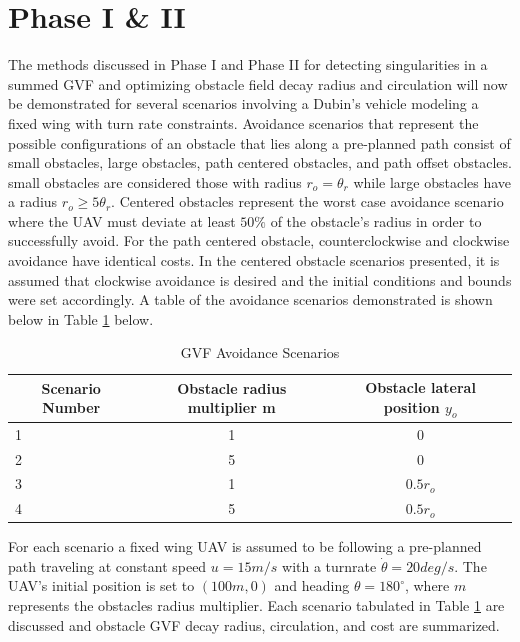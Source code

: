 \documentclass[numbered,pdftex]{ohio-etd}
\begin{document}
\section{Phase I \& II}

The methods discussed in Phase I and Phase II for detecting singularities in a summed GVF and optimizing obstacle field decay radius and circulation will now be demonstrated for several scenarios involving a Dubin's vehicle modeling a fixed wing with turn rate constraints. Avoidance scenarios that represent the possible configurations of an obstacle that lies along a pre-planned path consist of small obstacles, large obstacles, path centered obstacles, and path offset obstacles. small obstacles are considered those with radius $r_o = \theta_r$ while large obstacles have a radius $r_o\ge5\theta_r$. Centered obstacles represent the worst case avoidance scenario where the UAV must deviate at least $50\%$ of the obstacle's radius in order to successfully avoid. For the path centered obstacle, counterclockwise and clockwise avoidance have identical costs. In the centered obstacle scenarios presented, it is assumed that clockwise avoidance is desired and the initial conditions and bounds were set accordingly. A table of the avoidance scenarios demonstrated is shown below in Table \ref{table:avoidanceScenarios} below.


\begin{table}[]
	\centering
	\caption{GVF Avoidance Scenarios}
	\label{table:avoidanceScenarios}
	\begin{tabular}{|l|c|c|}
		\hline
		\multicolumn{1}{|c|}{Scenario Number} & Obstacle radius multiplier m & Obstacle lateral position $y_o$    \\ \hline
		1                                     & 1 & 0     \\ \hline
		2                                     & 5 & 0     \\ \hline
		3                                     & 1 & $0.5r_o$ \\ \hline
		4                                     & 5 & $0.5r_o$ \\ \hline
	\end{tabular}
\end{table}




For each scenario a fixed wing UAV is assumed to be following a pre-planned path traveling at constant speed $u=15m/s$ with a turnrate $\dot{\theta}=20 deg/s$. The UAV's initial position is set to $(100m,0)$ and heading $\theta = 180^\circ$, where $m$ represents the obstacles radius multiplier. Each scenario tabulated in Table \ref{table:avoidanceScenarios} are discussed and obstacle GVF decay radius, circulation, and cost are summarized.\\
\end{document}
